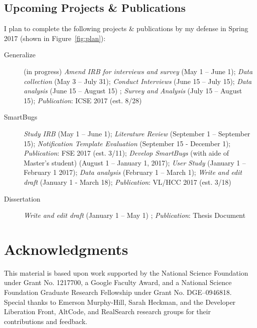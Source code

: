 \documentclass{llncs}
\begin{document}
\subsection{Upcoming Projects \& Publications}

I plan to complete the following projects \& publications by my defense in Spring 2017 (shown in Figure~\ref{fig:plan}):

\begin{description}
	\item[Generalize] (in progress) \textit{Amend IRB for interviews and survey} (May 1 -- June 1); \textit{Data collection} (May 3 -- July 31); \textit{Conduct Interviews} (June 15 -- July 15); \textit{Data analysis} (June 15 -- August 15) ; \textit{Survey and Analysis} (July 15 -- August 15); \textit{Publication}: ICSE 2017 (est. 8/28)
	\item[SmartBugs] \textit{Study IRB} (May 1 -- June 1); \textit{Literature Review} (September 1 -- September 15); \textit{Notification Template Evaluation} (September 15 - December 1); \textit{Publication}: FSE 2017 (est. 3/11); \textit{Develop SmartBugs} (with aide of Master's student) (August 1 -- January 1, 2017); \textit{User Study} (January 1 -- February 1 2017); \textit{Data analysis} (February 1 -- March 1); \textit{Write and edit draft} (January 1 - March 18); \textit{Publication}: VL/HCC 2017 (est. 3/18)
	\item[Dissertation] \textit{Write and edit draft} (January 1 -- May 1) ; \textit{Publication}: Thesis Document
\end{description}





\section*{Acknowledgments}
This material is based upon work supported by the National Science Foundation under
Grant No. 1217700, a Google Faculty Award, and a National Science Foundation
Graduate Research Fellowship under Grant No. DGE--0946818.
Special thanks to Emerson Murphy-Hill, Sarah Heckman, and the Developer Liberation Front, AltCode, and RealSearch research groups for their contributions and feedback.



\end{document}
